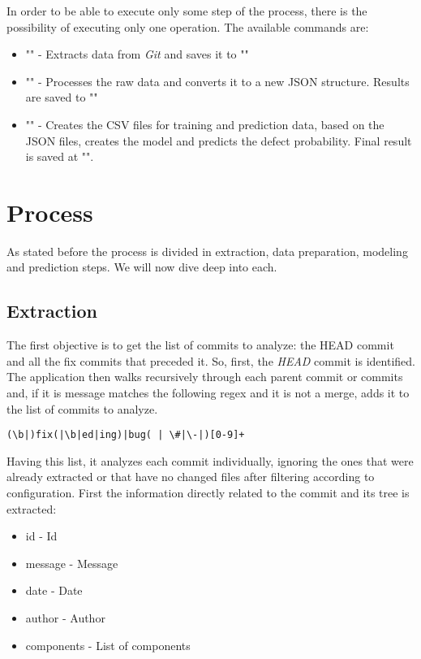 In order to be able to execute only some step of the process, there is the possibility of executing only one operation. The available commands are:
%
\begin{itemize}
\item "" - Extracts data from \emph{Git} and saves it to ""
\item "" - Processes the raw data and converts it to a new JSON structure. Results are saved to ""
\item "" - Creates the CSV files for training and prediction data, based on the JSON files, creates the model and predicts the defect probability.
Final result is saved at "".
\end{itemize}

\section{Process}

As stated before the process is divided in extraction, data preparation, modeling and prediction steps. We will now dive deep into each.

\subsection{Extraction}

The first objective is to get the list of commits to analyze: the HEAD commit and all the fix commits that preceded it. 
So, first, the \emph{HEAD} commit is identified. The application then walks recursively through each parent commit or commits and,
if it is message matches the following regex and it is not a merge, adds it to the list of commits to analyze.

\begin{lstlisting}
(\b|)fix(|\b|ed|ing)|bug( | \#|\-|)[0-9]+
\end{lstlisting}

Having this list, it analyzes each commit individually, ignoring the ones that were already extracted or that have no changed files after filtering according to configuration.
First the information directly related to the commit and its tree is extracted:
%
\begin{itemize}
\item id - Id
\item message - Message
\item date - Date
\item author - Author
\item components - List of components
\end{itemize}

